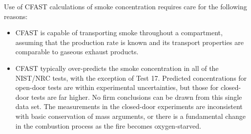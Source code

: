 Use of CFAST calculations of smoke concentration requires care for the following reasons:

\begin{itemize}
\item CFAST is capable of transporting smoke throughout a compartment, assuming that the production rate is known and its transport properties are comparable to gaseous exhaust products.
\item CFAST typically over-predicts the smoke concentration in all of the NIST/NRC tests, with the exception of Test 17.  Predicted concentrations for open-door tests are within experimental uncertainties, but those for closed-door tests are far higher.  No firm conclusions can be drawn from this single data set.  The measurements in the closed-door experiments are inconsistent with basic conservation of mass arguments, or there is a fundamental change in the combustion process as the fire becomes oxygen-starved.
\end{itemize}